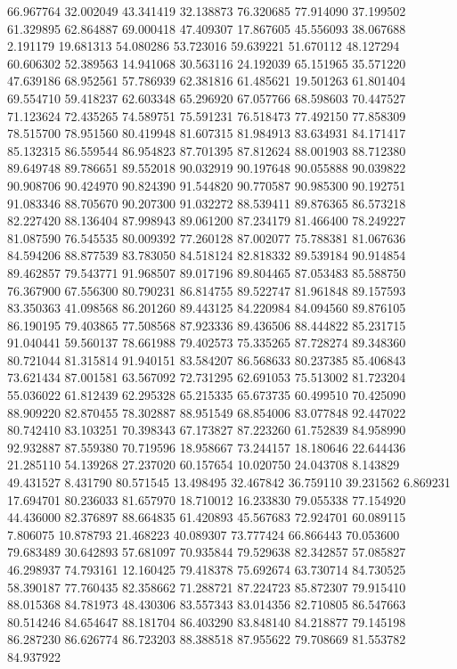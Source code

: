 66.967764
32.002049
43.341419
32.138873
76.320685
77.914090
37.199502
61.329895
62.864887
69.000418
47.409307
17.867605
45.556093
38.067688
2.191179
19.681313
54.080286
53.723016
59.639221
51.670112
48.127294
60.606302
52.389563
14.941068
30.563116
24.192039
65.151965
35.571220
47.639186
68.952561
57.786939
62.381816
61.485621
19.501263
61.801404
69.554710
59.418237
62.603348
65.296920
67.057766
68.598603
70.447527
71.123624
72.435265
74.589751
75.591231
76.518473
77.492150
77.858309
78.515700
78.951560
80.419948
81.607315
81.984913
83.634931
84.171417
85.132315
86.559544
86.954823
87.701395
87.812624
88.001903
88.712380
89.649748
89.786651
89.552018
90.032919
90.197648
90.055888
90.039822
90.908706
90.424970
90.824390
91.544820
90.770587
90.985300
90.192751
91.083346
88.705670
90.207300
91.032272
88.539411
89.876365
86.573218
82.227420
88.136404
87.998943
89.061200
87.234179
81.466400
78.249227
81.087590
76.545535
80.009392
77.260128
87.002077
75.788381
81.067636
84.594206
88.877539
83.783050
84.518124
82.818332
89.539184
90.914854
89.462857
79.543771
91.968507
89.017196
89.804465
87.053483
85.588750
76.367900
67.556300
80.790231
86.814755
89.522747
81.961848
89.157593
83.350363
41.098568
86.201260
89.443125
84.220984
84.094560
89.876105
86.190195
79.403865
77.508568
87.923336
89.436506
88.444822
85.231715
91.040441
59.560137
78.661988
79.402573
75.335265
87.728274
89.348360
80.721044
81.315814
91.940151
83.584207
86.568633
80.237385
85.406843
73.621434
87.001581
63.567092
72.731295
62.691053
75.513002
81.723204
55.036022
61.812439
62.295328
65.215335
65.673735
60.499510
70.425090
88.909220
82.870455
78.302887
88.951549
68.854006
83.077848
92.447022
80.742410
83.103251
70.398343
67.173827
87.223260
61.752839
84.958990
92.932887
87.559380
70.719596
18.958667
73.244157
18.180646
22.644436
21.285110
54.139268
27.237020
60.157654
10.020750
24.043708
8.143829
49.431527
8.431790
80.571545
13.498495
32.467842
36.759110
39.231562
6.869231
17.694701
80.236033
81.657970
18.710012
16.233830
79.055338
77.154920
44.436000
82.376897
88.664835
61.420893
45.567683
72.924701
60.089115
7.806075
10.878793
21.468223
40.089307
73.777424
66.866443
70.053600
79.683489
30.642893
57.681097
70.935844
79.529638
82.342857
57.085827
46.298937
74.793161
12.160425
79.418378
75.692674
63.730714
84.730525
58.390187
77.760435
82.358662
71.288721
87.224723
85.872307
79.915410
88.015368
84.781973
48.430306
83.557343
83.014356
82.710805
86.547663
80.514246
84.654647
88.181704
86.403290
83.848140
84.218877
79.145198
86.287230
86.626774
86.723203
88.388518
87.955622
79.708669
81.553782
84.937922
